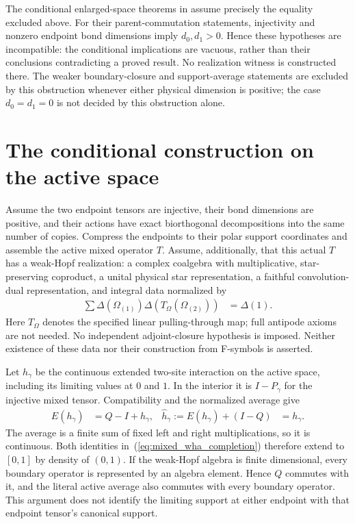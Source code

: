 \documentclass{article}
\begin{document}
The conditional enlarged-space theorems in
assume precisely the equality excluded above. For their parent-commutation
statements, injectivity and nonzero endpoint bond dimensions imply
$d_0,d_1>0$. Hence these hypotheses are incompatible: the conditional
implications are vacuous, rather than their conclusions contradicting a
proved result. No realization witness is constructed there. The weaker
boundary-closure and support-average statements are excluded by this
obstruction whenever either physical dimension is positive; the case
$d_0=d_1=0$ is not decided by this obstruction alone.

\section{The conditional construction on the active space}
Assume the two endpoint tensors are injective, their bond dimensions are
positive, and their actions have exact biorthogonal decompositions into
the same number of copies. Compress the endpoints to their polar support
coordinates and assemble the active mixed operator $T$.
Assume, additionally, that this actual $T$ has a weak-Hopf realization:
a complex coalgebra with multiplicative, star-preserving coproduct, a
unital physical star representation, a faithful convolution-dual
representation, and integral data normalized by
\begin{align}
    \sum\Delta(\Omega_{(1)})\Delta(T_\Omega(\Omega_{(2)})) & =\Delta(1).
    \label{eq:mixed_wha_normalization}
\end{align}
Here $T_\Omega$ denotes the specified linear pulling-through map; full
antipode axioms are not needed. No independent adjoint-closure hypothesis
is imposed. Neither existence of these data nor their construction from
F-symbols is asserted.

Let $h_\gamma$ be the continuous extended two-site interaction on the
active space, including its limiting values at $0$ and $1$. In the
interior it is $I-P_\gamma$ for the injective mixed tensor. Compatibility
and the normalized average give
\begin{align}
    E(h_\gamma)                          & =Q-I+h_\gamma, &
    \widehat h_\gamma:=E(h_\gamma)+(I-Q) & =h_\gamma.
    \label{eq:mixed_wha_completion}
\end{align}
The average is a finite sum of fixed left and right multiplications,
so it is continuous. Both identities in~(\ref{eq:mixed_wha_completion})
therefore extend to $[0,1]$ by density of $(0,1)$.
If the weak-Hopf algebra is finite dimensional, every boundary operator
is represented by an algebra element. Hence $Q$ commutes with it, and
the literal active average also commutes with every boundary operator. This argument does not
identify the limiting support at either endpoint with that endpoint
tensor's canonical support.
\end{document}
